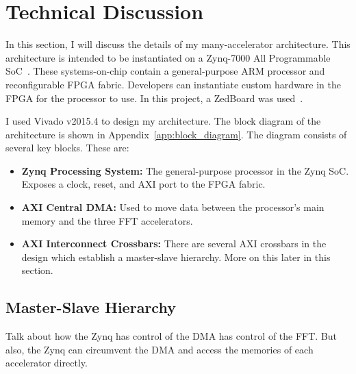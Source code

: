 \section{Technical Discussion}
In this section, I will discuss the details of my many-accelerator architecture. This architecture is intended to be instantiated on a Zynq-7000 All Programmable SoC~\cite{zynq}. These systems-on-chip contain a general-purpose ARM processor and reconfigurable FPGA fabric. Developers can instantiate custom hardware in the FPGA for the processor to use. In this project, a ZedBoard was used~\cite{zedboard}.

I used Vivado v2015.4 to design my architecture. The block diagram of the architecture is shown in Appendix~\ref{app:block_diagram}. The diagram consists of several key blocks. These are:
\begin{itemize}
\item \textbf{Zynq Processing System:} The general-purpose processor in the Zynq SoC. Exposes a clock, reset, and AXI port to the FPGA fabric.
\item \textbf{AXI Central DMA:} Used to move data between the processor's main memory and the three FFT accelerators.
\item \textbf{AXI Interconnect Crossbars:} There are several AXI crossbars in the design which establish a master-slave hierarchy. More on this later in this section.
\end{itemize}

\subsection{Master-Slave Hierarchy}
Talk about how the Zynq has control of the DMA has control of the FFT. But also, the Zynq can circumvent the DMA and access the memories of each accelerator directly.